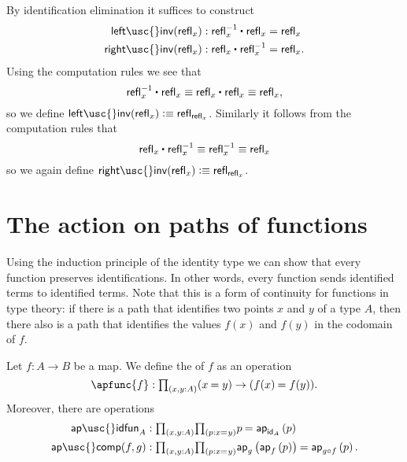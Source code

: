 \begin{constr}
By identification elimination it suffices to construct
\begin{align*}
\mathsf{left\usc{}inv}(\refl{x}) & : \ct{\refl{x}^{-1}}{\refl{x}} = \refl{x} \\
\mathsf{right\usc{}inv}(\refl{x}) & : \ct{\refl{x}}{\refl{x}^{-1}} = \refl{x}.
\end{align*}
Using the computation rules we see that
\begin{equation*}
\ct{\refl{x}^{-1}}{\refl{x}}\jdeq \ct{\refl{x}}{\refl{x}}\jdeq\refl{x},
\end{equation*}
so we define $\mathsf{left\usc{}inv}(\refl{x})\defeq \refl{\refl{x}}$. Similarly it follows from the computation rules that
\begin{equation*}
\ct{\refl{x}}{\refl{x}^{-1}} \jdeq \refl{x}^{-1}\jdeq \refl{x}
\end{equation*}
so we again define $\mathsf{right\usc{}inv}(\refl{x})\defeq\refl{\refl{x}}$. 
\end{constr}

\section{The action on paths of functions}

Using the induction principle of the identity type we can show that every function preserves identifications.
In other words, every function sends identified terms to identified terms.
Note that this is a form of continuity for functions in type theory: if there is a path that identifies two points $x$ and $y$ of a type $A$, then there also is a path that identifies the values $f(x)$ and $f(y)$ in the codomain of $f$. 

\begin{defn}\label{defn:ap}
Let $f:A\to B$ be a map. We define the  of $f$ as an operation
\begin{equation*}
\apfunc{f} : \prd*{x,y:A} (\id{x}{y})\to(\id{f(x)}{f(y)}).
\end{equation*}
Moreover, there are operations
\begin{align*}
\mathsf{ap\usc{}idfun}_A & : \prd*{x,y:A}{p:\id{x}{y}} \id{p}{\ap{\idfunc[A]}{p}} \\
\mathsf{ap\usc{}comp}(f,g) & : \prd*{x,y:A}{p:\id{x}{y}} \id{\ap{g}{\ap{f}{p}}}{\ap{g\circ f}{p}}.
\end{align*}
\end{defn}

